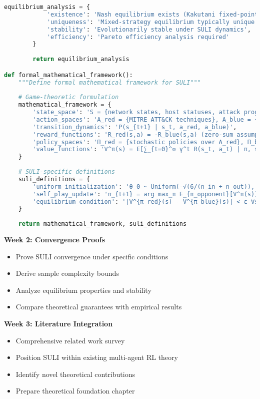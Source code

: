 \documentclass[12pt,a4paper]{article}
\begin{document}
\begin{lstlisting}[language=Python, caption=Theoretical Analysis Framework]
        equilibrium_analysis = {
            'existence': 'Nash equilibrium exists (Kakutani fixed-point theorem)',
            'uniqueness': 'Mixed-strategy equilibrium typically unique',
            'stability': 'Evolutionarily stable under SULI dynamics',
            'efficiency': 'Pareto efficiency analysis required'
        }
        
        return equilibrium_analysis

def formal_mathematical_framework():
    """Define formal mathematical framework for SULI"""
    
    # Game-theoretic formulation
    mathematical_framework = {
        'state_space': 'S = {network states, host statuses, attack progressions}',
        'action_spaces': 'A_red = {MITRE ATT&CK techniques}, A_blue = {defensive actions}',
        'transition_dynamics': 'P(s_{t+1} | s_t, a_red, a_blue)',
        'reward_functions': 'R_red(s,a) = -R_blue(s,a) (zero-sum assumption)',
        'policy_spaces': 'Π_red = {stochastic policies over A_red}, Π_blue = {stochastic policies over A_blue}',
        'value_functions': 'V^π(s) = E[∑_{t=0}^∞ γ^t R(s_t, a_t) | π, s_0 = s]'
    }
    
    # SULI-specific definitions
    suli_definitions = {
        'uniform_initialization': 'θ_0 ~ Uniform(-√(6/(n_in + n_out)), √(6/(n_in + n_out)))',
        'self_play_update': 'π_{t+1} = arg max_π E_{π_opponent}[V^π(s)]',
        'equilibrium_condition': '|V^{π_red}(s) - V^{π_blue}(s)| < ε ∀s ∈ S'
    }
    
    return mathematical_framework, suli_definitions
\end{lstlisting}

\textbf{Week 2: Convergence Proofs}
\begin{itemize}
    \item Prove SULI convergence under specific conditions
    \item Derive sample complexity bounds
    \item Analyze equilibrium properties and stability
    \item Compare theoretical guarantees with empirical results
\end{itemize}

\textbf{Week 3: Literature Integration}
\begin{itemize}
    \item Comprehensive related work survey
    \item Position SULI within existing multi-agent RL theory
    \item Identify novel theoretical contributions
    \item Prepare theoretical foundation chapter
\end{itemize}
\end{document}
